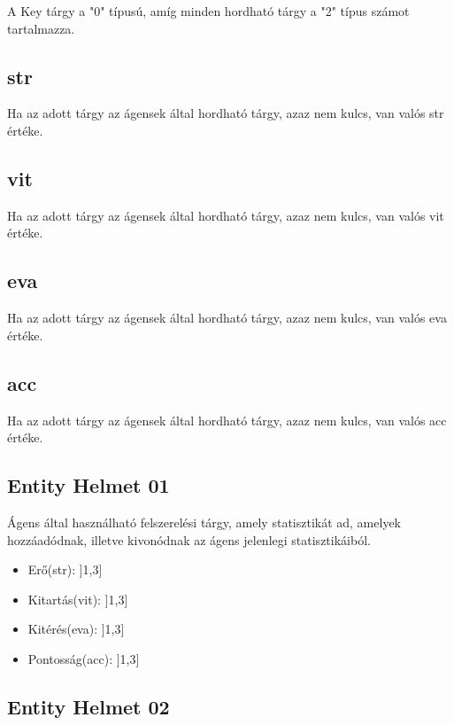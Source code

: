 A Key tárgy a "0" típusú, amíg minden hordható tárgy a "2" típus számot tartalmazza.

\subsection{str}

Ha az adott tárgy az ágensek által hordható tárgy, azaz nem kulcs, van valós str értéke.

\subsection{vit}

Ha az adott tárgy az ágensek által hordható tárgy, azaz nem kulcs, van valós vit értéke.

\subsection{eva}

Ha az adott tárgy az ágensek által hordható tárgy, azaz nem kulcs, van valós eva értéke.

\subsection{acc}

Ha az adott tárgy az ágensek által hordható tárgy, azaz nem kulcs, van valós acc értéke.


\subsection{Entity Helmet 01}

Ágens által használható felszerelési tárgy, amely statisztikát ad, amelyek hozzáadódnak, illetve kivonódnak az ágens jelenlegi statisztikáiból.

\begin{itemize}
    \item Erő(str): ]1,3]
    \item Kitartás(vit): ]1,3]
    \item Kitérés(eva): ]1,3]
    \item Pontosság(acc): ]1,3]
\end{itemize}

\subsection{Entity Helmet 02}


